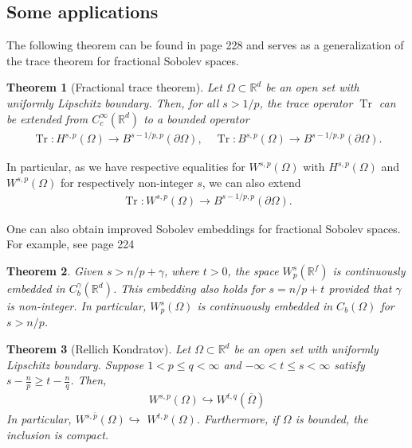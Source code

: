 \documentclass[
    a4paper,
    DIV=14,
    abstract=true,
    numbers=noenddot
]
{scrartcl}
\newtheorem{theorem}{Theorem}[section]
\theoremstyle{definition}
\newcommand{\R}{\mathbb{R}}
\begin{document}
\subsection{Some applications}
The following theorem can be found in \cite{agranovich2015sobolev} page 228 and serves as a generalization of the trace theorem for fractional Sobolev spaces.
\begin{theorem}[Fractional trace theorem]\label{trace theorem}
  Let $\Omega \subset \R^d$ be an open set with uniformly Lipschitz boundary. Then, for all $s>1 / p$, the trace operator $\operatorname{Tr}$ can be extended from $C_c^\infty (\R^d)$  to a bounded operator
  \begin{align*}
    \operatorname{Tr}: H^{s,p}(\Omega ) \to B^{s-1/p,p}(\partial\Omega), \quad \operatorname{Tr}: B^{s,p}(\Omega ) \to B^{s-1/p,p}(\partial\Omega).
  \end{align*}
\end{theorem}
In particular, as we have respective equalities for $W^{s,p}(\Omega )$ with $H^{s,p}(\Omega )$ and $W^{s,p}(\Omega )$ for respectively non-integer  $s$, we can also extend
\begin{align*}
  \operatorname{Tr}: W^{s,p}(\Omega ) \to B^{s-1/p,p}(\partial\Omega).
\end{align*}

One can also obtain improved Sobolev embeddings for fractional Sobolev spaces. For example, see \cite{agranovich2015sobolev} page 224
\begin{theorem}
  Given $s>n / p + \gamma $,
  where $t>0$, the space $W_p^s\left(\mathbb{R}^f\right)$ is continuously embedded in $C_b^\gamma \left(\mathbb{R}^d\right)$. This embedding also holds for $s=n / p+t$ provided that $\gamma $ is non-integer.
  In particular, $W_p^s\left(\Omega\right)$ is continuously embedded in $C_b\left(\Omega\right)$ for $s>n / p$.
\end{theorem}
\begin{theorem}[Rellich Kondratov]\label{sobolev embeddings}
  Let $\Omega \subset \R^d$ be an open set with uniformly Lipschitz boundary.
  Suppose $1<p \leq q<\infty$ and $-\infty<t \leq s<\infty$ satisfy $s-\frac{n}{p} \geq t-\frac{n}{q}$. Then,
  \begin{align*}
    W^{s, p}\left(\Omega\right) \hookrightarrow W^{t, q}\left(\overline\Omega\right)
  \end{align*}
  In particular, $W^{s, \bar{p}}\left(\Omega\right) \hookrightarrow$ $W^{t, p}\left(\Omega\right)$. Furthermore, if $\Omega $ is bounded, the inclusion is compact.

\end{theorem}






\end{document}

